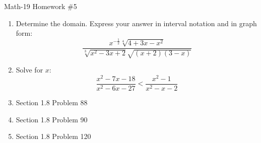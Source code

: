 \documentclass[letterpaper,12pt,fleqn]{article}
\begin{document}
\begin{center}
\Large Math-19 Homework \#5
\end{center}

\vspace{0.5in}

\begin{enumerate}
\item Determine the domain. Express your answer in interval notation and in
graph form:
\[\frac{x^{-\frac{1}{2}}\sqrt[4]{4+3x-x^2}}{\sqrt[3]{x^2-3x+2}\sqrt{(x+2)(3-x)}}\]

\item Solve for $x$:
\[\frac{x^2-7x-18}{x^2-6x-27}<\frac{x^2-1}{x^2-x-2}\]

\item Section 1.8 Problem 88

\item Section 1.8 Problem 90

\item Section 1.8 Problem 120

\end{enumerate}
\end{document}
